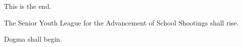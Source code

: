 This is the end.

The Senior Youth League for the Advancement of School Shootings shall
rise.

Dogma shall begin.
